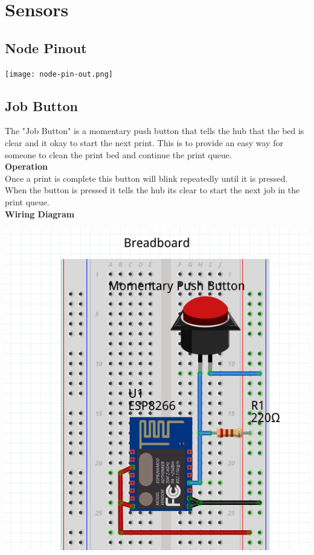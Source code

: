 \documentclass [10pt]{book}
\begin{document}
  \section{Sensors}
  \subsection{Node Pinout}
  \begin{center}
        \texttt{[image: node-pin-out.png]}
  \end{center}
    \subsection{Job Button}
      The "Job Button" is a momentary push button that tells the hub that the bed
      is clear and it okay to start the next print. This is to provide an easy way
      for someone to clean the print bed and continue the print queue.\\

      \textbf{Operation}\\
      Once a print is complete this button will blink repeatedly until it is pressed.
      When the button is pressed it tells the hub its clear to start the next job in the
      print queue.\\

      \textbf{Wiring Diagram}\\
            \begin{center}
      \includegraphics[scale=0.25]{job-cir.png}
      \end{center}
\end{document}
